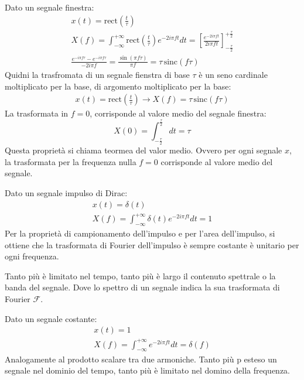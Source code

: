 \documentclass{article}
\numberwithin{equation}{subsection}
\begin{document}
Dato un segnale finestra:
\begin{gather*}
    x(t)=\mbox{rect}\displaystyle\left(\frac{t}{\tau}\right)\\
    X(f)=\displaystyle\int_{-\infty}^{+\infty}\mbox{rect}\left(\frac{t}{\tau}\right)e^{-2i\pi ft}dt=\left[\frac{e^{-2i\pi ft}}{2i\pi ft}\right]^{+\frac{\tau}{2}}_{-\frac{\tau}{2}}\\
    \displaystyle\frac{e^{-i\pi f\tau}-e^{-i\pi f\tau}}{-2i\pi f}=\frac{\sin(\pi f\tau)}{\pi f}=\tau\,\mbox{sinc}(f\tau)
\end{gather*}
Quidni la trasfromata di un segnale fienstra di base $\tau$ è un seno cardinale moltiplicato per la base, di argomento moltiplicato per la base:
\begin{gather*}
    x(t)=\mbox{rect}\displaystyle\left(\frac{t}{\tau}\right)\rightarrow X(f)=\tau\,\mbox{sinc}(f\tau)
\end{gather*}
La trasformata in $f=0$, corrisponde al valore medio del segnale finestra:
\begin{equation*}
    X(0)=\displaystyle\int_{-\frac{\tau}{2}}^{\frac{\tau}{2}}dt=\tau
\end{equation*}
Questa proprietà si chiama teormea del valor medio. Ovvero per ogni segnale $x$, la trasformata per la frequenza nulla $f=0$ corrisponde al valore medio del segnale. 



Dato un segnale impulso di Dirac:
\begin{gather*}
    x(t)=\delta(t)\\
    X(f)=\displaystyle\int_{-\infty}^{+\infty}\delta(t)e^{-2i\pi ft}dt=1
\end{gather*}
Per la proprietà di campionamento dell'impulso e per l'area dell'impulso, si ottiene che la trasformata di Fourier dell'impulso è sempre costante è unitario per ogni frequenza. 


Tanto più è limitato nel tempo, tanto più è largo il contenuto spettrale o la banda del segnale. Dove lo spettro di un segnale indica la sua trasformata di Fourier 
$\mathscr{F}$. 


Dato un segnale costante:
\begin{gather*}
    x(t)=1\\
    X(f)=\displaystyle\int_{-\infty}^{+\infty}e^{-2i\pi ft}dt=\delta (f)
\end{gather*}
Analogamente al prodotto scalare tra due armoniche. 
Tanto più p esteso un segnale nel dominio del tempo, tanto più è limitato nel domino della frequenza. 
\end{document}
